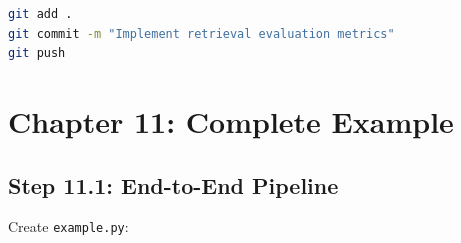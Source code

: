 \documentclass[12pt,a4paper]{article}
\begin{document}
\begin{gitcommit}
\begin{lstlisting}[language=bash]
git add .
git commit -m "Implement retrieval evaluation metrics"
git push
\end{lstlisting}
\end{gitcommit}

\section{Chapter 11: Complete Example}

\subsection{Step 11.1: End-to-End Pipeline}

Create \texttt{example.py}:
\end{document}
